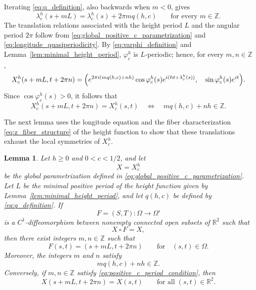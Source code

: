 \documentclass[a4paper,11pt]{amsart}
\numberwithin{equation}{section}
\theoremstyle{plain}
\newtheorem{lem}[thm]{Lemma}
\begin{document}
Iterating \eqref{eq:q_definition}, also backwards when $m<0$, gives
\begin{equation}\label{eq:longitude_quasiperiodicity}
\lambda_c^h(s+mL)=\lambda_c^h(s)+2\pi m q(h,c)
\qquad\text{for every }m\in\mathbb Z.
\end{equation}
The translation relations associated with the height period $L$ and the
angular period $2\pi$ follow from
\eqref{eq:global_positive_c_parametrization} and
\eqref{eq:longitude_quasiperiodicity}. By \eqref{eq:varphi_definition} and
Lemma~\ref{lem:minimal_height_period}, $\varphi_c^h$ is $L$-periodic;
hence, for every $m,n\in\mathbb Z$,
\begin{equation*}
\begin{aligned}
X_c^h(s+mL,t+2\pi n)
=
\Bigl(
e^{2\pi i(mq(h,c)+nh)}
 \cos\varphi_c^h(s)e^{i(ht+\lambda_c^h(s))},\quad
\sin\varphi_c^h(s)e^{it}
\Bigr).
\end{aligned}
\end{equation*}
Since $\cos\varphi_c^h(s)>0$, it follows that
\begin{equation}\label{eq:global_translation_period_condition}
X_c^h(s+mL,t+2\pi n)=X_c^h(s,t)
\quad\Longleftrightarrow\quad
mq(h,c)+nh\in\mathbb Z.
\end{equation}

The next lemma uses the longitude equation and the fiber
characterization \eqref{eq:z_fiber_structure} of the height function to
show that these translations exhaust the local symmetries of $X_c^h$.

\begin{lem}
\label{lem:local_transition_rigidity}
Let $h\geq0$ and $0<c<1/2$, and let
\[
X=X_c^h
\]
be the global parametrization defined in
\eqref{eq:global_positive_c_parametrization}. Let $L$ be the minimal
positive period of the height function given by
Lemma~\ref{lem:minimal_height_period}, and let $q(h,c)$ be defined by
\eqref{eq:q_definition}. If
\[
F=(S,T):\Omega\longrightarrow\Omega'
\]
is a $C^1$-diffeomorphism between nonempty connected open subsets of
$\mathbb R^2$ such that
\[
X\circ F=X,
\]
then there exist integers $m,n\in\mathbb Z$ such that
\[
F(s,t)=(s+mL,t+2\pi n)
\qquad\text{for}\quad (s,t)\in\Omega.
\]
Moreover, the integers $m$ and $n$ satisfy
\begin{equation}\label{eq:positive_c_period_condition}
mq(h,c)+nh\in\mathbb Z.
\end{equation}
Conversely, if $m,n\in\mathbb Z$ satisfy
\eqref{eq:positive_c_period_condition}, then
\[
X(s+mL,t+2\pi n)=X(s,t)
\qquad\text{for all }(s,t)\in\mathbb R^2.
\]
\end{lem}
\end{document}
